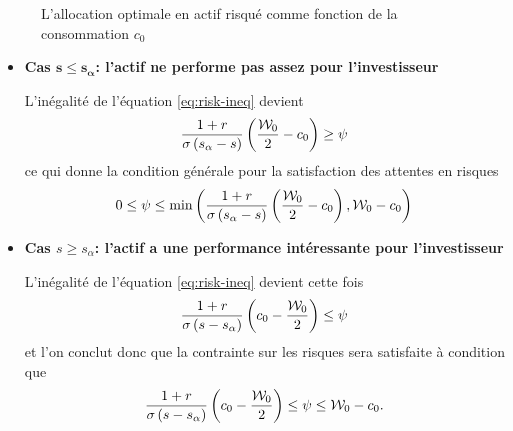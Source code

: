 \documentclass{article}
\numberwithin{equation}{section}
\begin{document}
\begin{figure}[h!]
\caption{L'allocation optimale en actif risqué comme fonction de la consommation $c_0$}
\label{fig:allocation-optim}
\end{figure}

\begin{itemize}
\item\textbf{Cas $\boldsymbol{s\leq s_\alpha}$: l'actif ne performe pas assez pour l'investisseur}

L'inégalité de l'équation \eqref{eq:risk-ineq} devient 
$$
\frac{1+r}{\sigma\left(s_\alpha - s\right)}\left( \frac{\mathcal{W}_0}{2} - c_0 \right) \geq \psi
$$
ce qui donne la condition générale pour la satisfaction des attentes en risques
\begin{equation}
0\leq\psi\leq \min\left( \frac{1+r}{\sigma\left(s_\alpha - s\right)}\left( \frac{\mathcal{W}_0}{2} - c_0 \right), \mathcal{W}_0 - c_0 \right)
\end{equation}

\item\textbf{Cas $s\geq s_\alpha$: l'actif a une performance intéressante pour l'investisseur} 

L'inégalité de l'équation \eqref{eq:risk-ineq} devient cette fois
$$
\frac{1+r}{\sigma\left(s - s_\alpha\right)}\left( c_0  - \frac{\mathcal{W}_0}{2}\right) \leq \psi
$$
et l'on conclut donc que la contrainte sur les risques sera satisfaite à condition que
\begin{equation}\label{eq:cond2}
\frac{1+r}{\sigma\left(s - s_\alpha\right)}\left( c_0  - \frac{\mathcal{W}_0}{2}\right) \leq \psi\leq \mathcal{W}_0 - c_0.
\end{equation}
\end{itemize}
\end{document}
